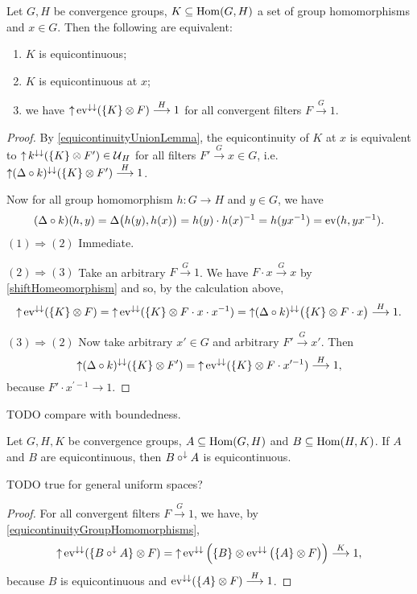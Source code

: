 \begin{proposition} \label{equicontinuityGroupHomomorphisms}
Let $G,H$ be convergence groups, $K\subseteq \operatorname{Hom}(G,H)$ a set of group homomorphisms and $x\in G$. Then the following are equivalent:
\begin{enumerate}
\item $K$ is equicontinuous;
\item $K$ is equicontinuous at $x$;
\item we have $\operatorname{\uparrow}\operatorname{ev}^{\downarrow\downarrow}(\{K\}\otimes F) \overset{H}{\longrightarrow} 1$ for all convergent filters $F\overset{G}{\longrightarrow} 1$.
\end{enumerate}
\end{proposition}
\begin{proof}
By \ref{equicontinuityUnionLemma}, the equicontinuity of $K$ at $x$ is equivalent to $\operatorname{\uparrow} k^{\downarrow\downarrow}(\{K\}\otimes F') \in \operatorname{\mathcal{U}}_H$ for all filters $F'\overset{G}{\longrightarrow} x\in G$, i.e. $\operatorname{\uparrow} (\Delta\circ k)^{\downarrow\downarrow}(\{K\}\otimes F')\overset{H}{\longrightarrow} 1$.

Now for all group homomorphism $h: G\to H$ and $y\in G$, we have
\[ (\Delta\circ k)(h,y) = \Delta\big(h(y), h(x)\big) = h(y)\cdot h(x)^{-1} = h(yx^{-1}) = \operatorname{ev}(h, yx^{-1}). \]
$(1) \Rightarrow (2)$ Immediate.

$(2) \Rightarrow (3)$ Take an arbitrary $F\overset{G}{\longrightarrow} 1$. We have $F\cdot x\overset{G}{\longrightarrow} x$ by \ref{shiftHomeomorphism} and so, by the calculation above,
\[ \operatorname{\uparrow}\operatorname{ev}^{\downarrow\downarrow}(\{K\}\otimes F) = \operatorname{\uparrow}\operatorname{ev}^{\downarrow\downarrow}(\{K\}\otimes F\cdot x\cdot x^{-1}) = \operatorname{\uparrow} (\Delta\circ k)^{\downarrow\downarrow}\big(\{K\}\otimes F\cdot x \big) \overset{H}{\longrightarrow} 1. \]

$(3) \Rightarrow (2)$ Now take arbitrary $x'\in G$ and arbitrary $F' \overset{G}{\longrightarrow} x'$. Then
\[ \operatorname{\uparrow} (\Delta\circ k)^{\downarrow\downarrow}(\{K\}\otimes F') = \operatorname{\uparrow}\operatorname{ev}^{\downarrow\downarrow}(\{K\}\otimes F\cdot x^{\prime -1}) \overset{H}{\longrightarrow} 1, \]
because $F'\cdot x^{\prime -1} \to 1$.
\end{proof}
TODO compare with boundedness.

\begin{lemma}
Let $G,H,K$ be convergence groups, $A\subseteq \operatorname{Hom}(G,H)$ and $B\subseteq \operatorname{Hom}(H,K)$. If $A$ and $B$ are equicontinuous, then $B\circ^\downarrow A$ is equicontinuous.
\end{lemma}
TODO true for general uniform spaces?
\begin{proof}
For all convergent filters $F\overset{G}{\longrightarrow} 1$, we have, by \ref{equicontinuityGroupHomomorphisms},
\[ \operatorname{\uparrow}\operatorname{ev}^{\downarrow\downarrow}(\{B\circ^\downarrow A\}\otimes F) = \operatorname{\uparrow}\operatorname{ev}^{\downarrow\downarrow}\Big(\{B\}\otimes \operatorname{ev}^{\downarrow\downarrow}\big(\{A\}\otimes F\big)\Big) \overset{K}{\longrightarrow} 1, \]
because $B$ is equicontinuous and $\operatorname{ev}^{\downarrow\downarrow}(\{A\}\otimes F)\overset{H}{\longrightarrow} 1$.
\end{proof}


